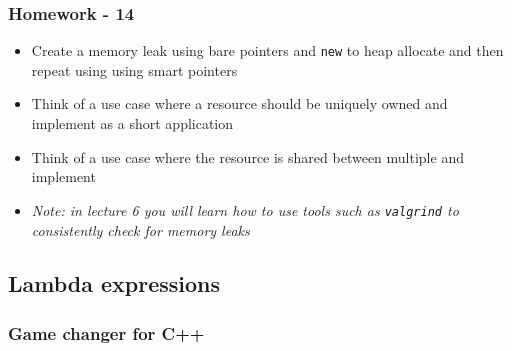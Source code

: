 \hypertarget{homework---14}{%
\subsubsection{Homework - 14}\label{homework---14}}

\begin{itemize}
\tightlist
\item
  Create a memory leak using bare pointers and \texttt{new} to heap
  allocate and then repeat using using smart pointers
\item
  Think of a use case where a resource should be uniquely owned and
  implement as a short application
\item
  Think of a use case where the resource is shared between multiple and
  implement
\item
  \emph{Note: in lecture 6 you will learn how to use tools such as
  \texttt{valgrind} to consistently check for memory leaks}
\end{itemize}

\hypertarget{lambda-expressions}{%
\subsection{Lambda expressions}\label{lambda-expressions}}

\hypertarget{game-changer-for-c}{%
\subsubsection{Game changer for C++}\label{game-changer-for-c}}

